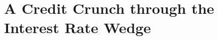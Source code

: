 \documentclass[12pt]{article} %
\numberwithin{equation}{section} %
\numberwithin{figure}{section}
\numberwithin{table}{section}
\begin{document}







\section{A Credit Crunch through the Interest Rate Wedge}
\label{sec:wedge}
\end{document}
